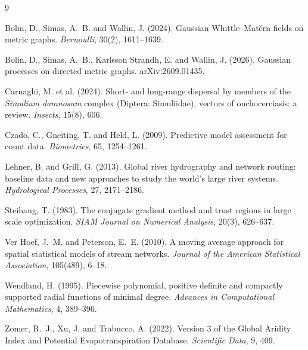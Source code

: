 \documentclass[11pt,a4paper]{article}
\begin{document}
\begin{thebibliography}{9}

Bolin, D., Simas, A.~B. and Wallin, J. (2024).
\newblock Gaussian Whittle--Mat\'ern fields on metric graphs.
\newblock \textit{Bernoulli}, 30(2), 1611--1639.

Bolin, D., Simas, A.~B., Karlsson Strandh, E. and Wallin, J. (2026).
\newblock Gaussian processes on directed metric graphs.
\newblock arXiv:2609.01435.

Carnaghi, M. et al. (2024).
\newblock Short- and long-range dispersal by members of the \textit{Simulium damnosum} complex (Diptera: Simuliidae), vectors of onchocerciasis: a review.
\newblock \textit{Insects}, 15(8), 606.

Czado, C., Gneiting, T. and Held, L. (2009).
\newblock Predictive model assessment for count data.
\newblock \textit{Biometrics}, 65, 1254--1261.

Lehner, B. and Grill, G. (2013).
\newblock Global river hydrography and network routing: baseline data and new approaches to study the world's large river systems.
\newblock \textit{Hydrological Processes}, 27, 2171--2186.

Steihaug, T. (1983).
\newblock The conjugate gradient method and trust regions in large scale optimization.
\newblock \textit{SIAM Journal on Numerical Analysis}, 20(3), 626--637.

Ver Hoef, J.~M. and Peterson, E.~E. (2010).
\newblock A moving average approach for spatial statistical models of stream networks.
\newblock \textit{Journal of the American Statistical Association}, 105(489), 6--18.

Wendland, H. (1995).
\newblock Piecewise polynomial, positive definite and compactly supported radial functions of minimal degree.
\newblock \textit{Advances in Computational Mathematics}, 4, 389--396.

Zomer, R.~J., Xu, J. and Trabucco, A. (2022).
\newblock Version 3 of the Global Aridity Index and Potential Evapotranspiration Database.
\newblock \textit{Scientific Data}, 9, 409.

\end{thebibliography}
\end{document}
